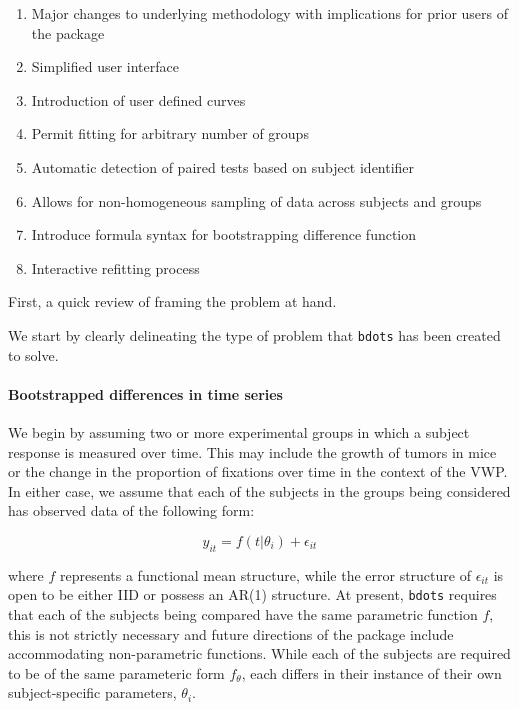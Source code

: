 \documentclass{article}
\newcommand{\xt}{\texttt}%
\begin{document}
\begin{singlespace}
\begin{enumerate}
\item Major changes to underlying methodology with implications for prior users of the package
\item Simplified user interface
\item Introduction of user defined curves
\item Permit fitting for arbitrary number of groups
\item Automatic detection of paired tests based on subject identifier
\item Allows for non-homogeneous sampling of data across subjects and groups
\item Introduce formula syntax for bootstrapping difference function
\item Interactive refitting process
\end{enumerate}
\end{singlespace}

First, a quick review of framing the problem at hand.

We start by clearly delineating the type of problem that \xt{bdots} has been created to solve.

\paragraph{Bootstrapped differences in time series}

We begin by assuming two or more experimental groups in which a subject response is measured over time. This may include the growth of tumors in  mice or the change in the proportion of fixations over time in the context of the VWP. In either case, we assume that each of the subjects in the groups being considered has observed data of the following form:

\begin{equation}
y_{it} = f(t | \theta_i) + \epsilon_{it} 
\end{equation}


where $f$ represents a functional mean structure, while the error structure of $\epsilon_{it}$ is open to be either IID or possess an AR(1) structure. At present, \xt{bdots} requires that each of the subjects being compared have the same parametric function $f$, this is not strictly necessary and future directions of the package include accommodating non-parametric functions. While each of the subjects are required to be of the same parameteric form $f_{\theta}$, each differs in their instance of their own subject-specific parameters, $\theta_i$.
\end{document}

